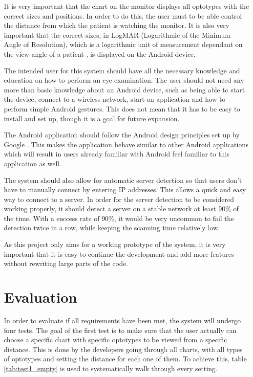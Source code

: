 \documentclass[12pt,a4paper,notitlepage]{report}
\begin{document}
It is very important that the chart on the monitor displays all optotypes with the correct sizes and positions. In order to do this, the user must to be able control the distance from which the patient is watching the monitor. It is also very important that the correct sizes, in LogMAR (Logarithmic of the Minimum Angle of Resolution), which is a logarithmic unit of measurement dependant on the view angle of a patient \cite{Bailey}, is displayed on the Android device.

The intended user for this system should have all the necessary knowledge and education on how to perform an eye examination. The user should not need any more than basic knowledge about an Android device, such as being able to start the device, connect to a wireless network, start an application and how to perform simple Android gestures. This does not mean that it has to be easy to install and set up, though it is a goal for future expansion. 

The Android application should follow the Android design principles set up by Google \cite{android_design}. This makes the application behave similar to other Android applications which will result in users already familiar with Android feel familiar to this application as well.

The system should also allow for automatic server detection so that users don't have to manually connect by entering IP addresses. This allows a quick and easy way to connect to a server. In order for the server detection to be considered working properly, it should detect a server on a stable network at least 90\% of the time. With a success rate of 90\%, it would be very uncommon to fail the detection twice in a row, while keeping the scanning time relatively low.

As this project only aims for a working prototype of the system, it is very important that it is easy to continue the development and add more features without rewriting large parts of the code.

\section{Evaluation \label{sec:evaluation}}
In order to evaluate if all requirements have been met, the system will undergo four tests. The goal of the first test is to make sure that the user actually can choose a specific chart with specific optotypes to be viewed from a specific distance. This is done by the developers going through all charts, with all types of optotypes and setting the distance for each one of them. To achieve this, table \ref{tab:test1_empty} is used to systematically walk through every setting.
\end{document}
